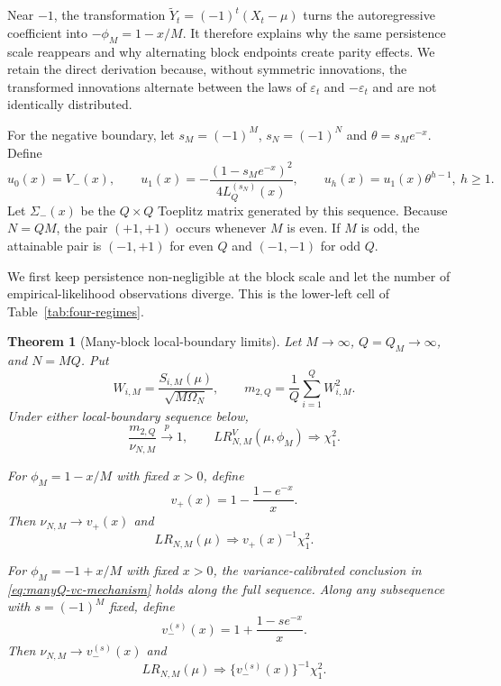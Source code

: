 \documentclass[12pt]{article}
\newtheorem{Theorem}{Theorem}[section]
\theoremstyle{remark}
\begin{document}
Near $-1$, the transformation $\widetilde Y_t=(-1)^t(X_t-\mu)$ turns the autoregressive coefficient into $-\phi_M=1-x/M$. It therefore explains why the same persistence scale reappears and why alternating block endpoints create parity effects. We retain the direct derivation because, without symmetric innovations, the transformed innovations alternate between the laws of $\varepsilon_t$ and $-\varepsilon_t$ and are not identically distributed.

For the negative boundary, let $s_M=(-1)^M$, $s_N=(-1)^N$ and $\theta=s_Me^{-x}$. Define
\begin{equation}
u_0(x)=V_-(x),
\qquad
u_1(x)=-\frac{(1-s_Me^{-x})^2}{4L_Q^{(s_N)}(x)},
\qquad
u_h(x)=u_1(x)\theta^{h-1},\ h\ge1.
\label{eq:boundary-cov-sequence}
\end{equation}
Let $\Sigma_-(x)$ be the $Q\times Q$ Toeplitz matrix generated by this sequence. Because $N=QM$, the pair $(+1,+1)$ occurs whenever $M$ is even. If $M$ is odd, the attainable pair is $(-1,+1)$ for even $Q$ and $(-1,-1)$ for odd $Q$.

We first keep persistence non-negligible at the block scale and let the number of empirical-likelihood observations diverge. This is the lower-left cell of Table~\ref{tab:four-regimes}.

\begin{Theorem}[Many-block local-boundary limits]
\label{thm:manyQ-boundary}
Let $M\to\infty$, $Q=Q_M\to\infty$, and $N=MQ$. Put
\[
W_{i,M}=\frac{S_{i,M}(\mu)}{\sqrt{M\Omega_N}},
\qquad
m_{2,Q}=\frac1Q\sum_{i=1}^QW_{i,M}^2.
\]
Under either local-boundary sequence below,
\begin{equation}
\frac{m_{2,Q}}{\nu_{N,M}}\xrightarrow{p}1,
\qquad
LR^V_{N,M}(\mu,\phi_M)\Rightarrow\chi_1^2.
\label{eq:manyQ-vc-mechanism}
\end{equation}

For $\phi_M=1-x/M$ with fixed $x>0$, define
\begin{equation}
v_+(x)=1-\frac{1-e^{-x}}{x}.
\label{eq:vplus-manyQ}
\end{equation}
Then $\nu_{N,M}\to v_+(x)$ and
\begin{equation}
LR_{N,M}(\mu)\Rightarrow v_+(x)^{-1}\chi_1^2.
\label{eq:manyQ-positive-law}
\end{equation}

For $\phi_M=-1+x/M$ with fixed $x>0$, the variance-calibrated conclusion in \eqref{eq:manyQ-vc-mechanism} holds along the full sequence. Along any subsequence with $s=(-1)^M$ fixed, define
\begin{equation}
v_-^{(s)}(x)=1+\frac{1-se^{-x}}{x}.
\label{eq:vminus-manyQ}
\end{equation}
Then $\nu_{N,M}\to v_-^{(s)}(x)$ and
\begin{equation}
LR_{N,M}(\mu)\Rightarrow \{v_-^{(s)}(x)\}^{-1}\chi_1^2.
\label{eq:manyQ-negative-law}
\end{equation}
\end{Theorem}
\end{document}
